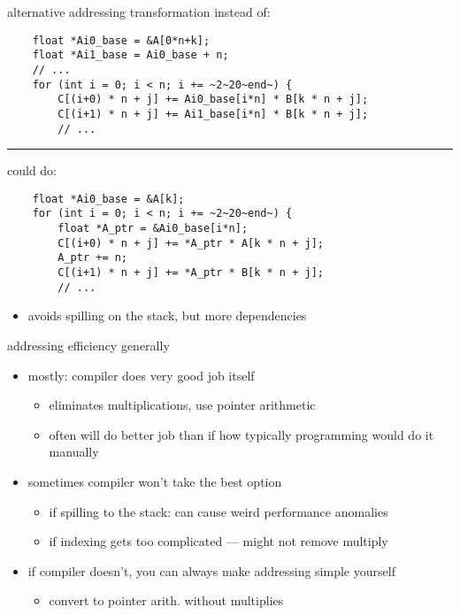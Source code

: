 \begin{frame}[fragile,label=addrXform2BackfireAlt]{alternative addressing transformation}
instead of:
\begin{lstlisting}
    float *Ai0_base = &A[0*n+k];
    float *Ai1_base = Ai0_base + n;
    // ...
    for (int i = 0; i < n; i += ~2~20~end~) {
        C[(i+0) * n + j] += Ai0_base[i*n] * B[k * n + j];
        C[(i+1) * n + j] += Ai1_base[i*n] * B[k * n + j];
        // ...
\end{lstlisting}
\hrule
could do:
\begin{lstlisting}
    float *Ai0_base = &A[k];
    for (int i = 0; i < n; i += ~2~20~end~) {
        float *A_ptr = &Ai0_base[i*n];
        C[(i+0) * n + j] += *A_ptr * A[k * n + j];
        A_ptr += n;
        C[(i+1) * n + j] += *A_ptr * B[k * n + j];
        // ...
\end{lstlisting}
    \begin{itemize}
    \item avoids spilling on the stack, but more dependencies
    \end{itemize}
\end{frame}

\begin{frame}{addressing efficiency generally}
    \begin{itemize}
    \item mostly: compiler does very good job itself
        \begin{itemize}
        \item eliminates multiplications, use pointer arithmetic
        \item often will do better job than if how typically programming would do it manually
        \end{itemize}
    \vspace{.5cm}
    \item sometimes compiler won't take the best option
        \begin{itemize}
        \item if spilling to the stack: can cause weird performance anomalies
        \item if indexing gets too complicated --- might not remove multiply
        \end{itemize}
    \item if compiler doesn't, you can always make addressing simple yourself
        \begin{itemize}
        \item convert to pointer arith. without multiplies
        \end{itemize}
    \end{itemize}
\end{frame}

